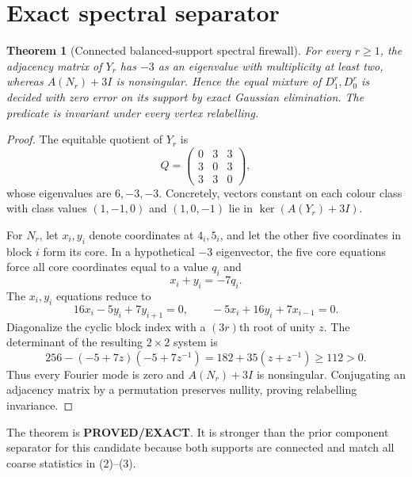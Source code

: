 \documentclass[11pt]{article}
\newtheorem{theorem}{Theorem}
\newcommand{\EXACT}{\textbf{PROVED/EXACT}}
\begin{document}
\section{Exact spectral separator}
\begin{theorem}[Connected balanced-support spectral firewall]
For every $r\ge1$, the adjacency matrix of $Y_r$ has $-3$ as an eigenvalue
with multiplicity at least two, whereas $A(N_r)+3I$ is nonsingular.  Hence
the equal mixture of $D_1^r,D_0^r$ is decided with zero error on its support
by exact Gaussian elimination.  The predicate is invariant under every
vertex relabelling.
\end{theorem}
\begin{proof}
The equitable quotient of $Y_r$ is
\[
 Q=\begin{pmatrix}0&3&3\\3&0&3\\3&3&0\end{pmatrix},
\]
whose eigenvalues are $6,-3,-3$.  Concretely, vectors constant on each colour
class with class values $(1,-1,0)$ and $(1,0,-1)$ lie in
$\ker(A(Y_r)+3I)$.

For $N_r$, let $x_i,y_i$ denote coordinates at $4_i,5_i$, and let the other
five coordinates in block $i$ form its core.  In a hypothetical
$-3$ eigenvector, the five core equations force all core coordinates equal
to a value $q_i$ and
\[
 x_i+y_i=-7q_i.
\]
The $x_i,y_i$ equations reduce to
\[
 16x_i-5y_i+7y_{i+1}=0,\qquad
 -5x_i+16y_i+7x_{i-1}=0.                                 \tag{4}
\]
Diagonalize the cyclic block index with a $(3r)$th root of unity $z$.  The
determinant of the resulting $2\times2$ system is
\[
 256-(-5+7z)(-5+7z^{-1})
 =182+35(z+z^{-1})\ge112>0.                              \tag{5}
\]
Thus every Fourier mode is zero and $A(N_r)+3I$ is nonsingular.  Conjugating
an adjacency matrix by a permutation preserves nullity, proving relabelling
invariance.
\end{proof}

The theorem is \EXACT{}.  It is stronger than the prior component separator
for this candidate because both supports are connected and match all coarse
statistics in (2)--(3).
\end{document}
